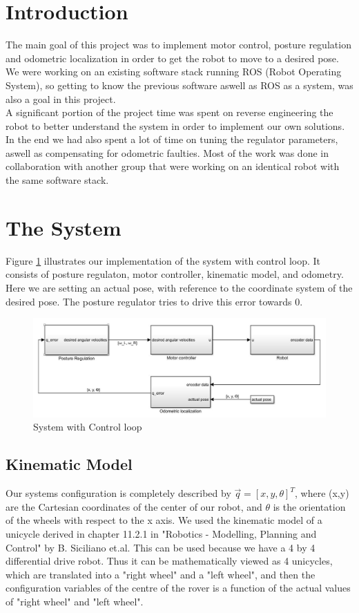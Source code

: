 \documentclass[a4paper,10pt]{article}
\begin{document}
\section{Introduction}
The main goal of this project was to implement motor control, posture regulation and odometric localization in order to get the robot to move to a desired pose. 
We were working on an existing software stack running ROS (Robot Operating System), so getting to know the previous software aswell as ROS as a system, 
was also a goal in this project.\\
A significant portion of the project time was spent on reverse engineering the robot to better understand the system in order to implement our own solutions. 
In the end we had also spent a lot of time on tuning the regulator parameters, aswell as compensating for odometric faulties. 
Most of the work was done in collaboration with another group that were working on an identical robot with the same software stack. \\

\section{The System}
Figure \ref{fig:blockdiagram} illustrates our implementation of the system with control loop. It consists of posture regulaton, motor controller, 
kinematic model, and odometry. Here we are setting an actual pose, with reference to the coordinate system of the desired pose. 
The posture regulator tries to drive this error towards 0.

	\begin{figure}[H]
	\centering
	\includegraphics[width=1\textwidth]{blokkskjema.JPG}
	\caption{System with Control loop}	
 	\label{fig:blockdiagram}
	\end{figure}

\subsection{Kinematic Model}
Our systems configuration is completely described by $\vec{q} = [x, y, \theta]^T$, where (x,y) are the Cartesian coordinates of the center of our robot, 
and $\theta$ is the orientation of the wheels with respect to the x axis. 
We used the kinematic model of a unicycle derived in chapter 11.2.1 in "Robotics - Modelling, Planning and Control" by B. Siciliano et.al. 
This can be used because we have a 4 by 4 differential drive robot. Thus it can be mathematically viewed as 4 unicycles, which are translated into a "right wheel" and a "left wheel", 
and then the configuration variables of the centre of the rover is a function of the actual values of "right wheel" and "left wheel".
\end{document}
